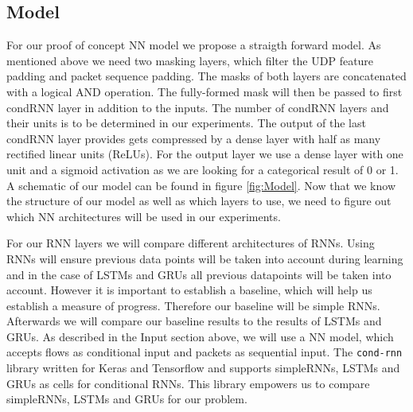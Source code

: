 \documentclass[
	ngerman,
	ruledheaders=section,%
	class=report,%
	thesis={type=bachelor},%
	accentcolor=9c,%
	custommargins=true,%
	marginpar=false,%
	parskip=half-,%
	fontsize=11pt,%
]{tudapub}
\let\code\texttt
\begin{document}



\subsection{Model}
\label{sec:NNmodel}

For our proof of concept NN model we propose a straigth forward model.
As mentioned above we need two masking layers, which filter the UDP feature padding and packet sequence padding.
The masks of both layers are concatenated with a logical AND operation.
The fully-formed mask will then be passed to first condRNN layer in addition to the inputs.
The number of condRNN layers and their units is to be determined in our experiments.
The output of the last condRNN layer provides gets compressed by a dense layer with half as many rectified linear units (ReLUs).
For the output layer we use a dense layer with one unit and a sigmoid activation as we are looking for a categorical result of 0 or 1.
A schematic of our model can be found in figure \ref{fig:Model}.
Now that we know the structure of our model as well as which layers to use, we need to figure out which NN architectures will be used in our experiments.

For our RNN layers we will compare different architectures of RNNs.
Using RNNs will ensure previous data points will be taken into account during learning and in the case of LSTMs and GRUs all previous datapoints will be taken into account.
However it is important to establish a baseline, which will help us establish a measure of progress. %
Therefore our baseline will be simple RNNs.
Afterwards we will compare our baseline results to the results of LSTMs and GRUs.
As described in the Input section above, we will use a NN model, which accepts flows as conditional input and packets as sequential input.
The \code{cond-rnn} library \cite{remyPhilipperemyCondRnn2020} written for Keras and Tensorflow and supports simpleRNNs, LSTMs and GRUs as cells for conditional RNNs.
This library empowers us to compare simpleRNNs, LSTMs and GRUs for our problem.
\end{document}
